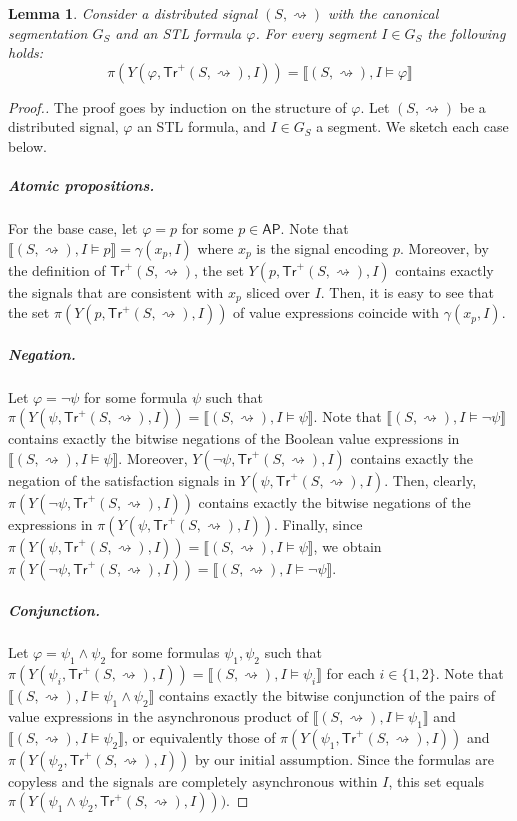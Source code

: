 \documentclass[iicol,lineno]{sn-jnl}
\newcommand{\hb}{\rightsquigarrow}
\newcommand{\tr}{\mathsf{Tr}}
\newcommand{\AP}{\mathsf{AP}}
\newcommand{\?}{\text{?}}
\newtheorem{lemma}{Lemma}
\begin{document}
	\begin{lemma} \label{cl:eq}
		Consider a distributed signal $(S,{\hb})$ with the canonical segmentation $G_S$ and an STL formula $\varphi$.
		For every segment $I \in G_S$ the following holds:
		\[ \pi(Y(\varphi, \tr^+(S,{\hb}), I)) = \llbracket (S,{\hb}), I \models \varphi \rrbracket \]
	\end{lemma}
	\begin{proof}[\normalsize Proof.]
		\normalsize
		The proof goes by induction on the structure of $\varphi$.
		Let $(S,{\hb})$ be a distributed signal, $\varphi$ an STL formula, and $I \in G_S$ a segment.
		We sketch each case below.
		
		\subparagraph*{Atomic propositions.}
		For the base case, let $\varphi = p$ for some $p \in \AP$.
		Note that $\llbracket (S, {\hb}), I \models p \rrbracket = \gamma(x_p, I)$ where $x_p$ is the signal encoding $p$.
		Moreover, by the definition of $\tr^+(S,{\hb})$, the set $Y(p, \tr^+(S,{\hb}), I)$ contains exactly the signals that are consistent with $x_p$ sliced over $I$.
		Then, it is easy to see that the set $\pi(Y(p, \tr^+(S,{\hb}), I))$ of value expressions coincide with $\gamma(x_p, I)$.
		
		\subparagraph*{Negation.}
		Let $\varphi = \lnot \psi$ for some formula $\psi$ such that $\pi(Y(\psi, \tr^+(S,{\hb}), I)) = \llbracket (S,{\hb}), I \models \psi \rrbracket$.
		Note that $\llbracket (S,{\hb}), I \models \lnot \psi \rrbracket$ contains exactly the bitwise negations of the Boolean value expressions in $\llbracket (S,{\hb}), I \models \psi \rrbracket$.
		Moreover, $Y(\lnot\psi, \tr^+(S,{\hb}), I)$ contains exactly the negation of the satisfaction signals in $Y(\psi, \tr^+(S,{\hb}), I)$.
		Then, clearly, $\pi(Y(\lnot\psi, \tr^+(S,{\hb}), I))$ contains exactly the bitwise negations of the expressions in $\pi(Y(\psi, \tr^+(S,{\hb}), I))$.
		Finally, since $\pi(Y(\psi, \tr^+(S,{\hb}), I)) = \llbracket (S,{\hb}), I \models \psi \rrbracket$, we obtain $\pi(Y(\lnot\psi, \tr^+(S,{\hb}), I)) = \llbracket (S,{\hb}), I \models \lnot\psi \rrbracket$.
		
		\subparagraph*{Conjunction.}
		Let $\varphi = \psi_1 \land \psi_2$ for some formulas $\psi_1, \psi_2$ such that $\pi(Y(\psi_i, \tr^+(S,{\hb}), I)) = \llbracket (S,{\hb}), I \models \psi_i \rrbracket$ for each $i \in \{1,2\}$.
		Note that $\llbracket (S,{\hb}), I \models \psi_1 \land \psi_2 \rrbracket$ contains exactly the bitwise conjunction of the pairs of value expressions in the asynchronous product of $\llbracket (S,{\hb}), I \models \psi_1 \rrbracket$ and $\llbracket (S,{\hb}), I \models \psi_2 \rrbracket$, or equivalently those of $\pi(Y(\psi_1, \tr^+(S,{\hb}), I))$ and $\pi(Y(\psi_2, \tr^+(S,{\hb}), I))$ by our initial assumption.
		Since the formulas are copyless and the signals are completely asynchronous within $I$, this set equals $\pi(Y(\psi_1 \land \psi_2, \tr^+(S,{\hb}), I)))$.
		

\end{proof}
\end{document}
